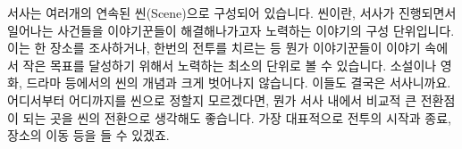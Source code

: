 \documentclass{report}
\begin{document}
	\bigskip
	
	서사는 여러개의 연속된 씬(Scene)으로 구성되어 있습니다. 씬이란, 서사가 진행되면서 일어나는 사건들을 이야기꾼들이 해결해나가고자 노력하는 이야기의 구성 단위입니다. 이는 한 장소를 조사하거나, 한번의 전투를 치르는 등 뭔가 이야기꾼들이 이야기 속에서 작은 목표를 달성하기 위해서 노력하는 최소의 단위로 볼 수 있습니다. 소설이나 영화, 드라마 등에서의 씬의 개념과 크게 벗어나지 않습니다. 이들도 결국은 서사니까요. 어디서부터 어디까지를 씬으로 정할지 모르겠다면, 뭔가 서사 내에서 비교적 큰 전환점이 되는 곳을 씬의 전환으로 생각해도 좋습니다. 가장 대표적으로 전투의 시작과 종료, 장소의 이동 등을 들 수 있겠죠.
\end{document}
